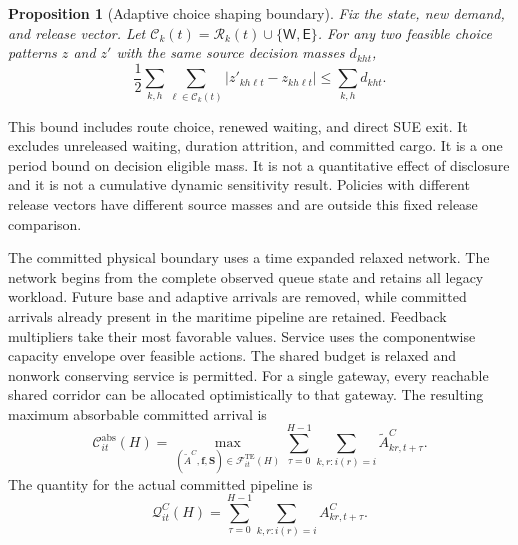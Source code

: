 \documentclass[a4paper,fleqn]{cas-sc}
\newtheorem{proposition}{Proposition}
\begin{document}
\begin{proposition}[Adaptive choice shaping boundary]
\label{prop:controllability}
Fix the state, new demand, and release vector. Let
$\mathcal C_k(t)=\mathcal R_k(t)\cup\{\mathsf W,\mathsf E\}$.
For any two feasible choice patterns $z$ and $z'$ with the same source decision
masses $d_{kht}$,
\begin{equation}
 \frac12\sum_{k,h}\sum_{\ell\in\mathcal C_k(t)}
 |z'_{kh\ell t}-z_{kh\ell t}|
 \le\sum_{k,h}d_{kht}.
 \label{eq:shapeable-bound}
\end{equation}
\end{proposition}
This bound includes route choice, renewed waiting, and direct SUE exit. It
excludes unreleased waiting, duration attrition, and committed cargo. It is a
one period bound on decision eligible mass. It is not a quantitative effect of
disclosure and it is not a cumulative dynamic sensitivity result. Policies
with different release vectors have different source masses and are outside
this fixed release comparison.

The committed physical boundary uses a time expanded relaxed network. The
network begins from the complete observed queue state and retains all legacy
workload. Future base and adaptive arrivals are removed, while committed
arrivals already present in the maritime pipeline are retained. Feedback
multipliers take their most favorable values. Service uses the componentwise
capacity envelope over feasible actions. The shared budget is relaxed and
nonwork conserving service is permitted. For a single gateway, every reachable
shared corridor can be allocated optimistically to that gateway. The resulting
maximum absorbable committed arrival is
\begin{equation}
 \mathcal C^{\mathrm{abs}}_{it}(H)=
 \max_{(\widetilde A^C,\mathbf f,\mathbf S)
 \in\mathcal F^{\mathrm{TE}}_{it}(H)}
 \sum_{\tau=0}^{H-1}
 \sum_{k,r:i(r)=i}\widetilde A^C_{kr,t+\tau}.
 \label{eq:absorption-capacity}
\end{equation}
The quantity for the actual committed pipeline is
\begin{equation}
 \mathcal Q^C_{it}(H)=
 \sum_{\tau=0}^{H-1}
 \sum_{k,r:i(r)=i}A^C_{kr,t+\tau}.
 \label{eq:committed-arrivals-window}
\end{equation}
\end{document}
